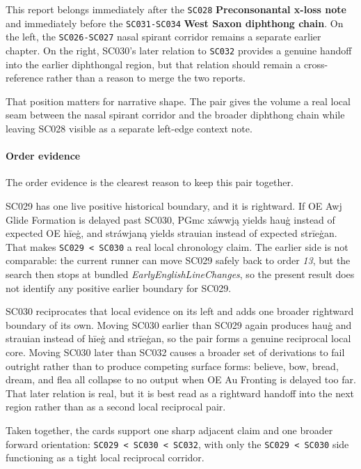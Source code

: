 \documentclass[
  british,
  a4paper,
]{article}
\begin{document}
This report belongs immediately after the \texttt{SC028}
\textbf{Preconsonantal x-loss note} and immediately before the
\texttt{SC031-SC034} \textbf{West Saxon diphthong chain}. On the left,
the \texttt{SC026-SC027} nasal spirant corridor remains a separate
earlier chapter. On the right, SC030's later relation to \texttt{SC032}
provides a genuine handoff into the earlier diphthongal region, but that
relation should remain a cross-reference rather than a reason to merge
the two reports.

That position matters for narrative shape. The pair gives the volume a
real local seam between the nasal spirant corridor and the broader
diphthong chain while leaving SC028 visible as a separate left-edge
context note.

\paragraph{Order evidence}\label{order-evidence-21}

The order evidence is the clearest reason to keep this pair together.

SC029 has one live positive historical boundary, and it is rightward. If
OE Awj Glide Formation is delayed past SC030, PGmc xáwwją yields hauġ
instead of expected OE hīeġ, and stráwjaną yields strauian instead of
expected strīeġan. That makes \texttt{SC029\ \textless{}\ SC030} a real
local chronology claim. The earlier side is not comparable: the current
runner can move SC029 safely back to order \emph{13}, but the search
then stops at bundled \emph{EarlyEnglishLineChanges}, so the present
result does not identify any positive earlier boundary for SC029.

SC030 reciprocates that local evidence on its left and adds one broader
rightward boundary of its own. Moving SC030 earlier than SC029 again
produces hauġ and strauian instead of hīeġ and strīeġan, so the pair
forms a genuine reciprocal local core. Moving SC030 later than SC032
causes a broader set of derivations to fail outright rather than to
produce competing surface forms: believe, bow, bread, dream, and flea
all collapse to no output when OE Au Fronting is delayed too far. That
later relation is real, but it is best read as a rightward handoff into
the next region rather than as a second local reciprocal pair.

Taken together, the cards support one sharp adjacent claim and one
broader forward orientation:
\texttt{SC029\ \textless{}\ SC030\ \textless{}\ SC032}, with only the
\texttt{SC029\ \textless{}\ SC030} side functioning as a tight local
reciprocal corridor.
\end{document}
